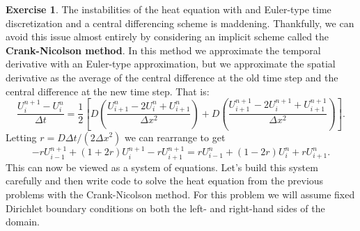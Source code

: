\documentclass[
]{book}
\theoremstyle{definition}
\theoremstyle{definition}
\theoremstyle{definition}
\newtheorem{exercise}{Exercise}[chapter]
\theoremstyle{remark}
\begin{document}
\begin{exercise}
\protect\hypertarget{exr:unnamed-chunk-574}{}{\label{exr:unnamed-chunk-574} }The instabilities of the heat equation with and Euler-type time discretization and a central differencing scheme is maddening. Thankfully, we can avoid this issue almost entirely by considering an implicit scheme called the \textbf{Crank-Nicolson method}. In this method we approximate the temporal derivative with an Euler-type approximation, but we approximate the spatial derivative as the average of the central difference at the old time step and the central difference at the new time step. That is:
\[\frac{U_i^{n+1} - U_i^n}{\Delta t} = \frac{1}{2} \left[D \left( \frac{U_{i+1}^n - 2U_i^n +
        U_{i+1}^n}{\Delta x^2}\right) +D \left(\frac{U_{i+1}^{n+1} - 2U_i^{n+1} +
    U_{i+1}^{n+1}}{\Delta x^2} \right) \right].\]
Letting
\(r = D \Delta t / (2\Delta x^2)\) we can rearrange to get
\[-r U_{i-1}^{n+1} + (1+2r) U_{i}^{n+1} - r U_{i+1}^{n+1} = r U_{i-1}^{n} + (1-2r)
    U_{i}^{n} + r U_{i+1}^{n}.\]
This can now be viewed as a system of equations. Let's build this system carefully and then write code to solve the heat equation from the previous problems with the Crank-Nicolson method. For this problem we will assume fixed Dirichlet boundary conditions on both the left- and right-hand sides of the domain.


\end{exercise}
\end{document}

